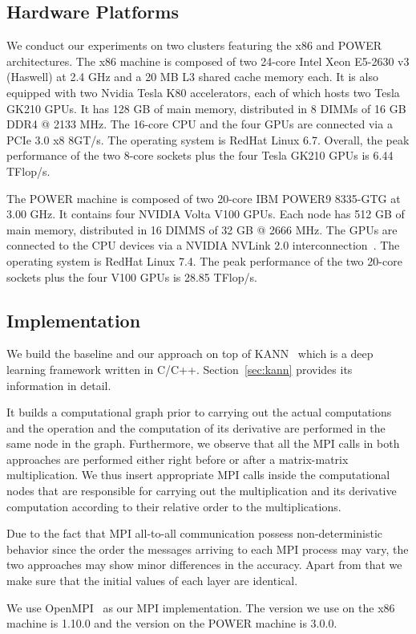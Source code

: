 \subsection{Hardware Platforms}
\label{sec:altsplit_platform}
We conduct our experiments on two clusters featuring the x86 and POWER 
architectures.
The x86 machine is composed of two 24-core Intel Xeon
\textregistered E5-2630 v3 (Haswell) at 2.4 GHz and a 20 MB L3 shared cache 
memory each.  It is also equipped with two Nvidia Tesla K80 accelerators, each 
of which hosts two Tesla GK210 GPUs.
It has 128 GB of main memory, distributed in 8 DIMMs of 16 GB DDR4 @ 2133 MHz.
The 16-core CPU and the four GPUs are connected via a PCIe 3.0 x8 8GT/s.
The operating system is RedHat Linux 6.7.
Overall, the peak performance of the two 8-core sockets plus the four Tesla 
GK210 GPUs is 6.44 TFlop/s. 

The POWER machine is composed of two 20-core IBM POWER9 8335-GTG at 3.00 GHz.  
It contains four NVIDIA Volta V100 GPUs.  
Each node has 512 GB of main memory, distributed in 16 DIMMS of 32 GB @ 2666 
MHz.  The GPUs are connected to the CPU devices via a NVIDIA NVLink 2.0 
interconnection~\cite{nvlink}.  The operating system is RedHat Linux 7.4.  The 
peak performance of the two 20-core sockets plus the four V100 GPUs is 28.85 
TFlop/s. 

\subsection{Implementation}
\label{sec:altsplit_software}
We build the baseline and our approach on top of KANN~\cite{kann} which is a 
deep learning framework written in C/C++. Section~\ref{sec:kann} provides its 
information in detail. 

It builds a computational graph prior to carrying out the actual computations 
and the operation and the computation of its derivative are performed in the same 
node in the graph. Furthermore, we observe that all the MPI calls in both 
approaches are performed either right before or after a matrix-matrix 
multiplication. We thus insert appropriate MPI calls inside the computational 
nodes that are responsible for carrying out the multiplication and its 
derivative computation according to their relative order to the multiplications.

Due to the fact that MPI all-to-all communication possess non-deterministic 
behavior since the order the messages arriving to each MPI process may vary, the 
two approaches may show minor differences in the accuracy. Apart from that we 
make sure that the initial values of each layer are identical. 

We use OpenMPI~\cite{openmpi, openmpi1} as our MPI implementation. The version we use 
on the x86 machine is 1.10.0 and the version on the POWER machine is 3.0.0.
